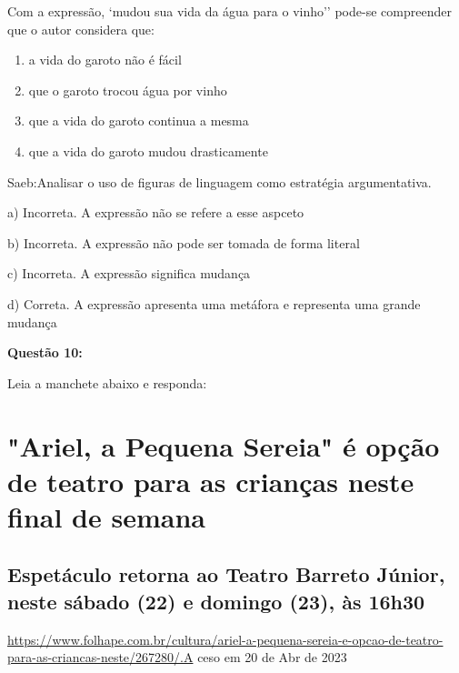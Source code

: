 Com a expressão, `mudou sua vida da água para o vinho'' pode-se
compreender que o autor considera que:

\begin{enumerate}
\def\labelenumi{\alph{enumi})}
\item
  a vida do garoto não é fácil
\item
  que o garoto trocou água por vinho
\item
  que a vida do garoto continua a mesma
\item
  que a vida do garoto mudou drasticamente
\end{enumerate}

Saeb:Analisar o uso de figuras de linguagem como estratégia
argumentativa.

a) Incorreta. A expressão não se refere a esse aspceto

b) Incorreta. A expressão não pode ser tomada de forma literal

c) Incorreta. A expressão significa mudança

d) Correta. A expressão apresenta uma metáfora e representa uma grande
mudança

\textbf{Questão 10:}

Leia a manchete abaixo e responda:

\hypertarget{ariel-a-pequena-sereia-uxe9-opuxe7uxe3o-de-teatro-para-as-crianuxe7as-neste-final-de-semana}{%
\section{\texorpdfstring{\textbf{"Ariel, a Pequena Sereia" é opção de
teatro para as crianças neste final de
semana}}{"Ariel, a Pequena Sereia" é opção de teatro para as crianças neste final de semana}}\label{ariel-a-pequena-sereia-uxe9-opuxe7uxe3o-de-teatro-para-as-crianuxe7as-neste-final-de-semana}}

\hypertarget{espetuxe1culo-retorna-ao-teatro-barreto-juxfanior-neste-suxe1bado-22-e-domingo-23-uxe0s-16h30}{%
\subsection{Espetáculo retorna ao Teatro Barreto Júnior, neste sábado
(22) e domingo (23), às
16h30}\label{espetuxe1culo-retorna-ao-teatro-barreto-juxfanior-neste-suxe1bado-22-e-domingo-23-uxe0s-16h30}}

\href{https://www.folhape.com.br/cultura/ariel-a-pequena-sereia-e-opcao-de-teatro-para-as-criancas-neste/267280/.A}{{https://www.folhape.com.br/cultura/ariel-a-pequena-sereia-e-opcao-de-teatro-para-as-criancas-neste/267280/.A}}
ceso em 20 de Abr de 2023

